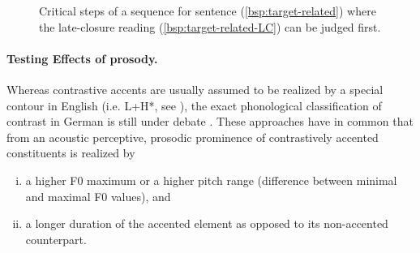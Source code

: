 \documentclass[fleqn,reqno,10pt,draft]{article}
\begin{document}
\begin{figure}[ht]
	\centering
	\caption[]{Critical steps of a sequence for sentence
          (\ref{bsp:target-related}) where the late-closure reading
          (\ref{bsp:target-related-LC}) can be judged first.}
	\label{fig:exec}
\end{figure}

\paragraph{Testing Effects of prosody.} Whereas contrastive accents
are usually assumed to be realized by a special contour in English
(i.e. L+H*, see \citet{Pierrehumbert90}), the exact phonological
classification of contrast in German is still under debate
\citep[see][]{Uhmann91,Fery93,Grabe98,Toepel06, Sudhoff10}.  These
approaches have in common that from an acoustic perceptive, prosodic
prominence of contrastively accented constituents is realized by

\begin{enumerate}[(i)]
\item a higher F0 maximum or a higher pitch range (difference 
between minimal and maximal F0 values), and
\item a longer duration of the accented element as opposed to its 
non-accented counterpart.
\end{enumerate}
\end{document}
